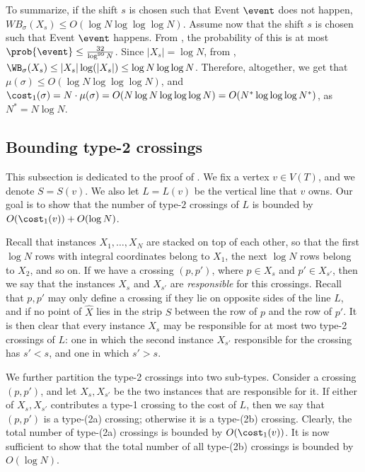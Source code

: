 \documentclass{toc}
\begin{document}
To summarize, if the shift $s$ is chosen such that Event $\event$ does not happen,  	 $WB_{\sigma}(X_s)\leq O(\log N \log\log\log N)$. Assume now that the shift $s$ is chosen such that Event $\event$ happens. From , the probability of this is at most 	 $\prob{\event}\leq \frac{32}{\log^{99}N}$. Since $|X_s|=\log N$, from , $\WB_{\sigma}(X_s)\leq |X_s|\log(|X_s|)\leq \log N\log\log N$. Therefore, altogether, we get that $\mu(\sigma)\leq O(\log N\log\log\log N)$, and $\cost_1(\sigma)=N\cdot \mu(\sigma)=O(N\log N\log\log\log N)=O(N^*\log\log\log N^*)$, as $N^*=N\log N$.


%
%
%
\subsection{Bounding type-2 crossings}\label{subsec:type-2} 
%
%
%

This subsection is dedicated to the proof of . We fix a vertex $v\in V(T)$, and we denote $S=S(v)$. We also let $L = L(v)$ be the vertical line that $v$ owns. 
Our goal is to show that the number of type-$2$ crossings of $L$ is bounded by $O(\cost_1(v))+O(\log N)$.

Recall that instances $X_1,\ldots,X_N$ are stacked on top of each other, so that the first $\log N$ rows with integral coordinates  belong to $X_1$, the next $\log N$ rows belong to $X_2$, and so on. If we have a crossing $(p,p')$, where $p\in X_s$ and $p'\in X_{s'}$, then we say that the instances $X_s$ and $X_{s'}$ are \emph{responsible} for this crossings. Recall that $p,p'$ may only define a crossing if they lie on opposite sides of the line $L$, and if no point of $\hat X$ lies in the strip $S$ between the row of $p$ and the row of $p'$. It is then clear that every instance $X_s$ may be responsible for at most two type-2 crossings of $L$: one in which the second instance $X_{s'}$ responsible for the crossing has $s'<s$, and one in which $s'>s$.

We further partition the type-2 crossings into two sub-types. Consider a crossing $(p,p')$, and let $X_s,X_{s'}$ be the two instances that are responsible for it. If either of $X_s,X_{s'}$ contributes a type-1 crossing to the cost of $L$, then we say that $(p,p')$ is a type-(2a) crossing; otherwise it is a type-(2b) crossing. Clearly, the total number of type-(2a) crossings is bounded by $O(\cost_1(v))$. It is now sufficient to show that the total number of all type-(2b) crossings is bounded by $O(\log N)$.
\end{document}
